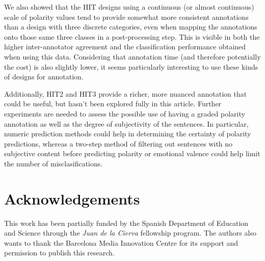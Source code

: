 \documentclass[11pt]{elsarticle}
\begin{document}
We also showed that the HIT designs using a continuous (or almost continuous) scale of polarity values tend to provide somewhat more consistent annotations than a design with three discrete categories, even when mapping the annotations onto those same three classes in a post-processing step. This is visible in both the higher inter-annotator agreement and the classification performance obtained when using this data. Considering that annotation time (and therefore potentially the cost) is also slightly lower, it seems particularly interesting to use these kinds of designs for annotation.

Additionally, HIT2 and HIT3 provide a richer, more nuanced annotation that could be useful, but hasn't been explored fully in this article. Further experiments are needed to assess the possible use of having a graded polarity annotation as well as the degree of subjectivity of the sentences. In particular, numeric prediction methods could help in determining the certainty of polarity predictions, whereas a two-step method of filtering out sentences with no subjective content before predicting polarity or emotional valence could help limit the number of misclasifications.


\section*{Acknowledgements}

This work has been partially funded by the Spanish Department of Education and Science through the \textit{Juan de la Cierva} fellowship program. The authors also wants to thank the Barcelona Media Innovation Centre for its support and permission to publish this research.





\end{document}
